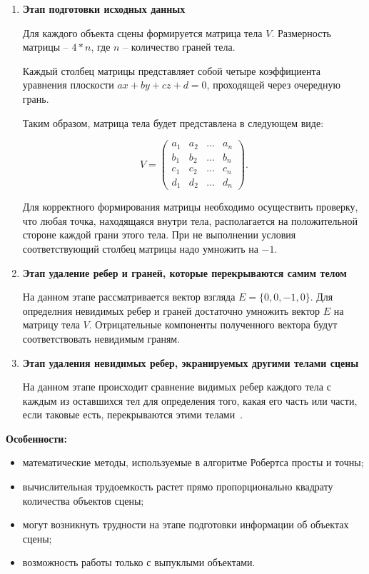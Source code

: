 \begin{enumerate}
	\item \textbf{Этап подготовки исходных данных} 
	
	\setlength{\parindent}{1.25cm}Для каждого объекта сцены формируется матрица тела $V$. 
    Размерность матрицы -- $4 * n$, где $n$ -- количество граней тела.
	
	Каждый столбец матрицы представляет собой четыре коэффициента уравнения плоскости $ax + by + cz + d = 0$, 
    проходящей через очередную грань.

	Таким образом, матрица тела будет представлена в следующем виде:

	\begin{equation}
		V = \begin{pmatrix}
			a_{1} & a_{2} & \ldots & a_{n}\\
			b_{1} & b_{2} & \ldots & b_{n}\\
			c_{1} & c_{2} & \ldots & c_{n}\\
			d_{1} & d_{2} & \ldots & d_{n}
		\end{pmatrix}.
	\end{equation}

    Для корректного формирования матрицы необходимо осуществить проверку, что любая точка, находящаяся внутри тела, 
    располагается на положительной стороне каждой грани этого тела. При не выполнении условия соответствующий столбец 
    матрицы надо умножить на $-1$.
    
    \clearpage
    \item \textbf{Этап удаление ребер и граней, которые перекрываются самим телом} 
	
    На данном этапе рассматривается вектор взгляда $E = \{0, 0, -1, 0\}$. Для определния невидимых ребер и граней 
    достаточно умножить вектор $E$ на матрицу тела $V$. Отрицательные компоненты полученного вектора 
    будут соответствовать невидимым граням.

	\item \textbf{Этап удаления невидимых ребер, экранируемых другими телами сцены}
	
    На данном этапе происходит сравнение видимых ребер каждого тела с каждым из оставшихся тел для определения того, какая его
    часть или части, если таковые есть, перекрываются этими телами~\cite{tpu}.

\end{enumerate}

\textbf{Особенности:}
\begin{itemize}
    \item математические методы, используемые в алгоритме Робертса просты и точны;
    \item вычислительная трудоемкость растет прямо пропорционально квадрату количества
    объектов сцены;
    \item могут возникнуть трудности на этапе подготовки информации об объектах сцены;
    \item возможность работы только с выпуклыми объектами.
\end{itemize}

